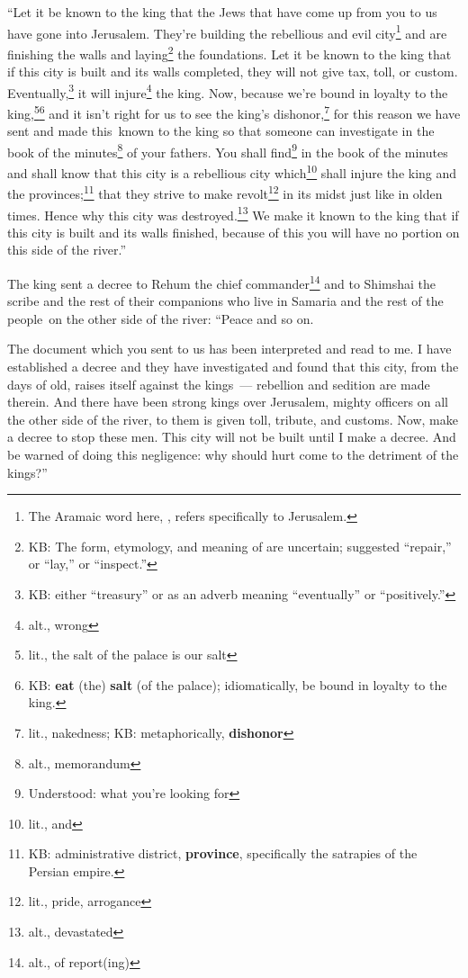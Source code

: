 \begin{inparaenum}
     ``Let it be known to the king that the Jews that have come up from you to us have gone into Jerusalem. They're building the rebellious and evil city\footnote{The Aramaic word here, , refers specifically to Jerusalem.} and are finishing the walls and laying\footnote{KB: The form, etymology, and meaning of  are uncertain; suggested ``repair,'' or ``lay,'' or ``inspect.''} the foundations.%
     Let it be known to the king that if this city is built and its walls completed, they will not give tax, toll, or custom. Eventually,\footnote{KB: either ``treasury'' or as an adverb meaning ``eventually'' or ``positively.''} it will injure\footnote{alt., wrong} the king.%
     Now, because we're bound in loyalty to the king,\footnote{lit., the salt of the palace is our salt}\footnote{KB: \textbf{eat} (the) \textbf{salt} (of the palace); idiomatically, be bound in loyalty to the king.} and it isn't right for us to see the king's dishonor,\footnote{lit., nakedness; KB: metaphorically, \textbf{dishonor}} for this reason we have sent and made this\understood\ known to the king%
     so that someone can investigate in the book of the minutes\footnote{alt., memorandum} of your fathers. You shall find\footnote{Understood: what you're looking for} in the book of the minutes and shall know that this city is a rebellious city which\understood\footnote{lit., and} shall injure the king and the provinces;\footnote{KB: administrative district, \textbf{province}, specifically the satrapies of the Persian empire.} that they strive to make revolt\footnote{lit., pride, arrogance} in its midst just like in olden times. Hence why this city was destroyed.\footnote{alt., devastated}%
     We make it known to the king that if this city is built and its walls finished, because of this you will have no portion on this side of the river.''%
    
     The king sent a decree to Rehum the chief commander\footnote{alt., of report(ing)} and to Shimshai the scribe and the rest of their companions who live in Samaria and the rest of the people\understood\ on the other side of the river: ``Peace and so on.%
    
     The document which you sent to us has been interpreted and read to me.%
     I have established a decree and they have investigated and found that this city, from the days of old, raises itself against the kings~--- rebellion and sedition are made therein.%
     And there have been strong kings over Jerusalem, mighty officers on all the other side of the river, to them is given toll, tribute, and customs.%
     Now, make a decree to stop these men. This city will not be built until I make a decree.%
     And be warned of doing this negligence: why should hurt come to the detriment of the kings?''%
    

\end{inparaenum}
